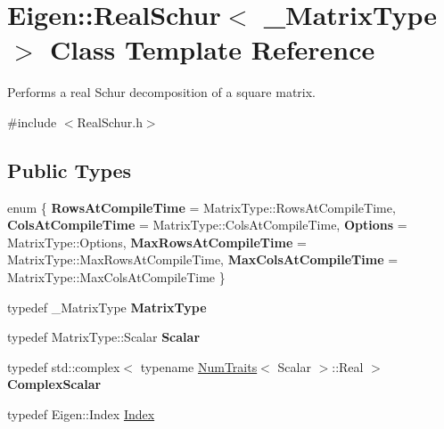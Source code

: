 \hypertarget{class_eigen_1_1_real_schur}{}\section{Eigen\+::Real\+Schur$<$ \+\_\+\+Matrix\+Type $>$ Class Template Reference}
\label{class_eigen_1_1_real_schur}


Performs a real Schur decomposition of a square matrix.  




{\ttfamily \#include $<$Real\+Schur.\+h$>$}

\subsection*{Public Types}
\begin{DoxyCompactItemize}
\item 
\mbox{\label{class_eigen_1_1_real_schur_a657d24fc29d8f142bec4935c6cb5aea5}} 
enum \{ \newline
{\bfseries Rows\+At\+Compile\+Time} = Matrix\+Type\+::Rows\+At\+Compile\+Time, 
{\bfseries Cols\+At\+Compile\+Time} = Matrix\+Type\+::Cols\+At\+Compile\+Time, 
{\bfseries Options} = Matrix\+Type\+::Options, 
{\bfseries Max\+Rows\+At\+Compile\+Time} = Matrix\+Type\+::Max\+Rows\+At\+Compile\+Time, 
\newline
{\bfseries Max\+Cols\+At\+Compile\+Time} = Matrix\+Type\+::Max\+Cols\+At\+Compile\+Time
 \}
\item 
\mbox{\label{class_eigen_1_1_real_schur_a2c400724529c2d19e886e865244f6ea7}} 
typedef \+\_\+\+Matrix\+Type {\bfseries Matrix\+Type}
\item 
\mbox{\label{class_eigen_1_1_real_schur_a9f63de2b06466efed32c6e721bde71c9}} 
typedef Matrix\+Type\+::\+Scalar {\bfseries Scalar}
\item 
\mbox{\label{class_eigen_1_1_real_schur_a269c5cf978680481656ad5e86d45894a}} 
typedef std\+::complex$<$ typename \mbox{\hyperlink{struct_eigen_1_1_num_traits}{Num\+Traits}}$<$ Scalar $>$\+::Real $>$ {\bfseries Complex\+Scalar}
\item 
typedef Eigen\+::\+Index \mbox{\hyperlink{class_eigen_1_1_real_schur_a8bd4653e2d9569a44ecc95e746422d3f}{Index}}

\end{DoxyCompactItemize}
